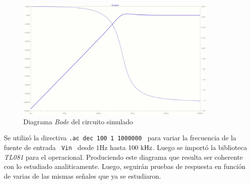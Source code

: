 \pagebreak	
\begin{figure}[hbt]
	\centering
	\includegraphics[width=10cm]{imagenes/BodeSimulacion}
	\caption{Diagrama \textit{Bode} del circuito simulado}
\end{figure}

	
Se utiliz\'o la directiva \texttt{.ac dec 100 1 1000000 } para
variar la  frecuencia de la fuente de entrada \texttt{ Vin } desde  $1 \si{\hertz}$ hasta $100 \ \si{\kilo\hertz}$. Luego se import\'o la biblioteca \textit{TL081} para el operacional. Produciendo este diagrama que resulta ser coherente con lo estudiado analiticamente.
Luego, seguir\'an pruebas de respuesta en funci\'on de varias de las mismas señales que ya se estudiaron.

